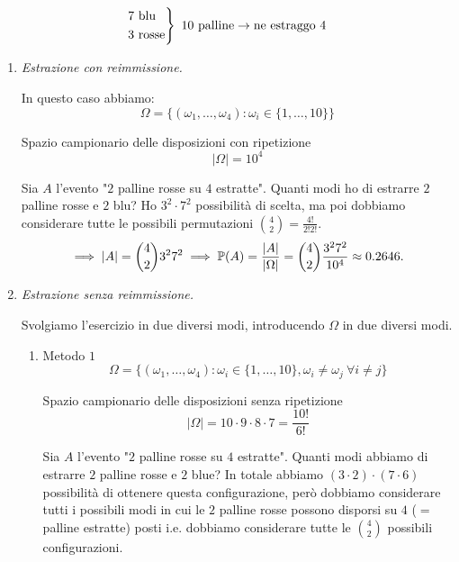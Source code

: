 \Soluzione

\begin{equation*}
	\begin{drcases}
		7\ \text{blu}\\
		3\ \text{rosse}
	\end{drcases}
	\ 10\ \text{palline}\rightarrow \text{ne estraggo} \ 4
\end{equation*}
\begin{enumerate}
	\item \textit{Estrazione con reimmissione.}

	In questo caso abbiamo:
	\begin{equation*}
	\Omega =\{(\omega_{1} ,\dots ,\omega_{4}) :\omega_{i} \in \{1,\dots ,10\}\}
	\end{equation*}

	Spazio campionario delle disposizioni con ripetizione
	\begin{equation*}
	| \Omega | =10^{4}
	\end{equation*}

	Sia $A$ l'evento "$2$ palline rosse su $4$ estratte". Quanti modi ho di estrarre $2$ palline rosse e $2$ blu? Ho $3^{2} \cdot 7^{2}$ possibilità di scelta, ma poi dobbiamo considerare tutte le possibili permutazioni $\binom{4}{2} =\frac{4!}{2!2!}$.
	\begin{equation*}
		\implies | A| =\binom{4}{2} 3^{2} 7^{2}\implies \mathbb{P}(A) =\frac{| A| }{| \Omega | } =\binom{4}{2}\frac{3^{2} 7^{2}}{10^{4}} \approx 0.2646.
	\end{equation*}
	\item \textit{Estrazione senza reimmissione.}

	Svolgiamo l'esercizio in due diversi modi, introducendo $\Omega $ in due diversi modi.
	\begin{enumerate}
		\item Metodo $1$
		\begin{equation*}
			\Omega =\{(\omega_{1} ,\dots ,\omega_{4}) :\omega_{i} \in \{1,\dots ,10\} ,\omega_{i} \neq \omega_{j} \ \forall i\neq j\}
		\end{equation*}

		Spazio campionario delle disposizioni senza ripetizione
		\begin{equation*}
			| \Omega | =10\cdot 9\cdot 8\cdot 7=\frac{10!}{6!}
		\end{equation*}

		Sia $A$ l'evento "$2$ palline rosse su $4$ estratte". Quanti modi abbiamo di estrarre $2$ palline rosse e $2$ blue? In totale abbiamo $(3\cdot 2) \cdot (7\cdot 6)$ possibilità di ottenere questa configurazione, però dobbiamo considerare tutti i possibili modi in cui le $2$ palline rosse possono disporsi su $4$ ($=$ palline estratte) posti i.e. dobbiamo considerare tutte le $\binom{4}{2}$ possibili configurazioni.


\end{enumerate}
\end{enumerate}
